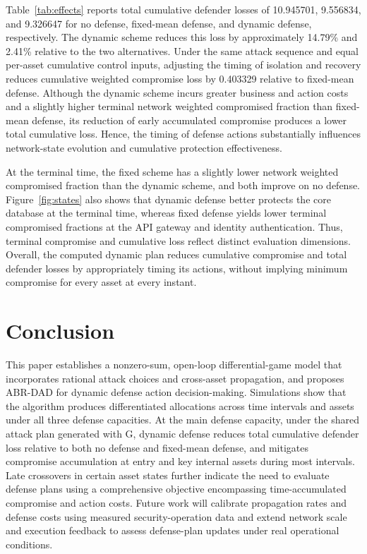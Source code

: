 \documentclass[conference,letterpaper]{IEEEtran}
\begin{document}
Table~\ref{tab:effects} reports total cumulative defender losses of 10.945701, 9.556834, and 9.326647 for no defense, fixed-mean defense, and dynamic defense, respectively. The dynamic scheme reduces this loss by approximately 14.79\% and 2.41\% relative to the two alternatives. Under the same attack sequence and equal per-asset cumulative control inputs, adjusting the timing of isolation and recovery reduces cumulative weighted compromise loss by 0.403329 relative to fixed-mean defense. Although the dynamic scheme incurs greater business and action costs and a slightly higher terminal network weighted compromised fraction than fixed-mean defense, its reduction of early accumulated compromise produces a lower total cumulative loss. Hence, the timing of defense actions substantially influences network-state evolution and cumulative protection effectiveness.

At the terminal time, the fixed scheme has a slightly lower network weighted compromised fraction than the dynamic scheme, and both improve on no defense. Figure~\ref{fig:states} also shows that dynamic defense better protects the core database at the terminal time, whereas fixed defense yields lower terminal compromised fractions at the API gateway and identity authentication. Thus, terminal compromise and cumulative loss reflect distinct evaluation dimensions. Overall, the computed dynamic plan reduces cumulative compromise and total defender losses by appropriately timing its actions, without implying minimum compromise for every asset at every instant.

\section{Conclusion}
This paper establishes a nonzero-sum, open-loop differential-game model that incorporates rational attack choices and cross-asset propagation, and proposes ABR-DAD for dynamic defense action decision-making. Simulations show that the algorithm produces differentiated allocations across time intervals and assets under all three defense capacities. At the main defense capacity, under the shared attack plan generated with G, dynamic defense reduces total cumulative defender loss relative to both no defense and fixed-mean defense, and mitigates compromise accumulation at entry and key internal assets during most intervals. Late crossovers in certain asset states further indicate the need to evaluate defense plans using a comprehensive objective encompassing time-accumulated compromise and action costs. Future work will calibrate propagation rates and defense costs using measured security-operation data and extend network scale and execution feedback to assess defense-plan updates under real operational conditions.
\end{document}
